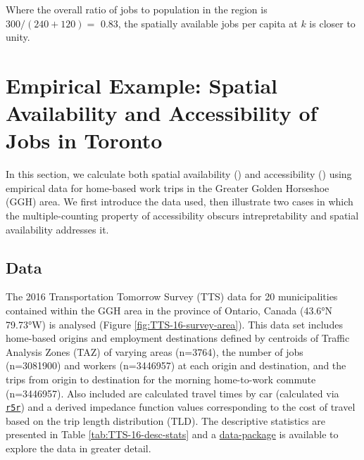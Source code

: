 \documentclass[]{elsarticle} %
\begin{document}
Where the overall ratio of jobs to population in the region is
\(300/(240 + 120)=\) 0.83, the spatially available jobs per capita at
\(k\) is closer to unity.

\hypertarget{empirical-example-spatial-availability-and-accessibility-of-jobs-in-toronto}{%
\section{Empirical Example: Spatial Availability and Accessibility of
Jobs in
Toronto}\label{empirical-example-spatial-availability-and-accessibility-of-jobs-in-toronto}}

In this section, we calculate both spatial availability () and
accessibility () using empirical data for home-based work trips in the
Greater Golden Horseshoe (GGH) area. We first introduce the data used,
then illustrate two cases in which the multiple-counting property of
accessibility obscurs intrepretability and spatial availability
addresses it.

\hypertarget{data}{%
\subsection{Data}\label{data}}

The 2016 Transportation Tomorrow Survey (TTS) data for 20 municipalities
contained within the GGH area in the province of Ontario, Canada (43.6°N
79.73°W) is analysed (Figure \ref{fig:TTS-16-survey-area}). This data
set includes home-based origins and employment destinations defined by
centroids of Traffic Analysis Zones (TAZ) of varying areas (n=3764), the
number of jobs (n=3081900) and workers (n=3446957) at each origin and
destination, and the trips from origin to destination for the morning
home-to-work commute (n=3446957). Also included are calculated travel
times by car (calculated via
\href{https://github.com/ipeaGIT/r5r}{\texttt{r5r}}) and a derived
impedance function values corresponding to the cost of travel based on
the trip length distribution (TLD). The descriptive statistics are
presented in Table \ref{tab:TTS-16-desc-stats} and a
\href{https://github.com/soukhova/AccessPack}{data-package} is available
to explore the data in greater detail.
\end{document}
